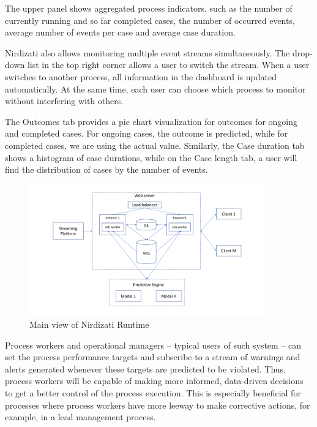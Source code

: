 \documentclass[runningheads,a4paper]{llncs}
\begin{document}
The upper panel shows aggregated process indicators, such as the number of currently running and so far completed cases, the number of occurred events, average number of events per case and average case duration.

Nirdizati also allows monitoring multiple event streams simultaneously. The drop-down list in the top right corner allows a user to switch the stream. When a user switches to another process, all information in the dashboard is updated automatically. At the same time, each user can choose which process to monitor without interfering with others.

The Outcomes tab provides a pie chart visualization for outcomes for ongoing and completed cases. For ongoing cases, the outcome is predicted, while for completed cases, we are using the actual value. Similarly, the Case duration tab shows a histogram of case durations, while on the Case length tab, a user will find the distribution of cases by the number of events.


\begin{figure}
	\centering
	\includegraphics[width=0.9\textwidth]{img/nirdizati-runtime}
	\caption{Main view of Nirdizati Runtime}
	\label{fig:nirdizati-runtime}
	\vspace{-0.5\baselineskip}
\end{figure}

Process workers and operational managers -- typical users of such system -- can set the process performance targets and subscribe to a stream of warnings and alerts generated whenever these targets are predicted to be violated. Thus, process workers will be capable of making more informed, data-driven decisions to get a better control of the process execution. This is especially beneficial for processes where process workers have more leeway to make corrective actions, for example, in a lead management process.
\end{document}
